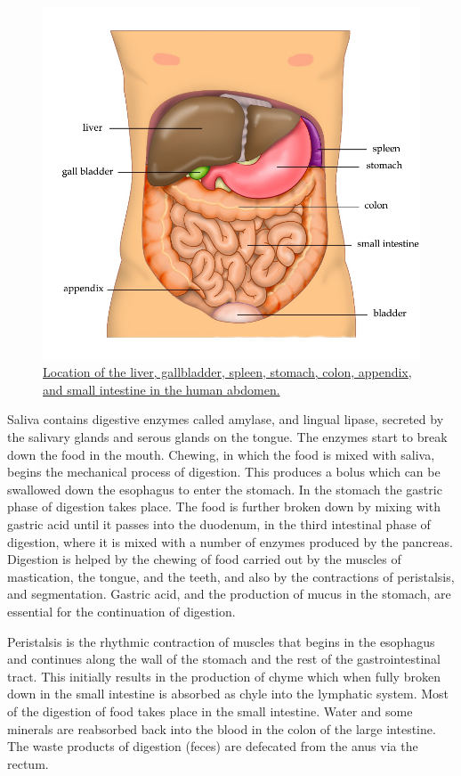 \begin{figure}

{\centering \includegraphics[width=0.7\linewidth]{./figures/digestive/Anatomy_Abdomen_Tiesworks} 

}

\caption{\href{https://commons.wikimedia.org/wiki/File:Anatomy_Abdomen_Tiesworks.jpg}{Location of the liver, gallbladder, spleen, stomach, colon, appendix, and small intestine in the human abdomen.}}\label{fig:humanabdomen}
\end{figure}

Saliva contains digestive enzymes called amylase, and lingual lipase, secreted by the salivary glands and serous glands on the tongue. The enzymes start to break down the food in the mouth. Chewing, in which the food is mixed with saliva, begins the mechanical process of digestion. This produces a bolus which can be swallowed down the esophagus to enter the stomach. In the stomach the gastric phase of digestion takes place. The food is further broken down by mixing with gastric acid until it passes into the duodenum, in the third intestinal phase of digestion, where it is mixed with a number of enzymes produced by the pancreas. Digestion is helped by the chewing of food carried out by the muscles of mastication, the tongue, and the teeth, and also by the contractions of peristalsis, and segmentation. Gastric acid, and the production of mucus in the stomach, are essential for the continuation of digestion.

Peristalsis is the rhythmic contraction of muscles that begins in the esophagus and continues along the wall of the stomach and the rest of the gastrointestinal tract. This initially results in the production of chyme which when fully broken down in the small intestine is absorbed as chyle into the lymphatic system. Most of the digestion of food takes place in the small intestine. Water and some minerals are reabsorbed back into the blood in the colon of the large intestine. The waste products of digestion (feces) are defecated from the anus via the rectum.


